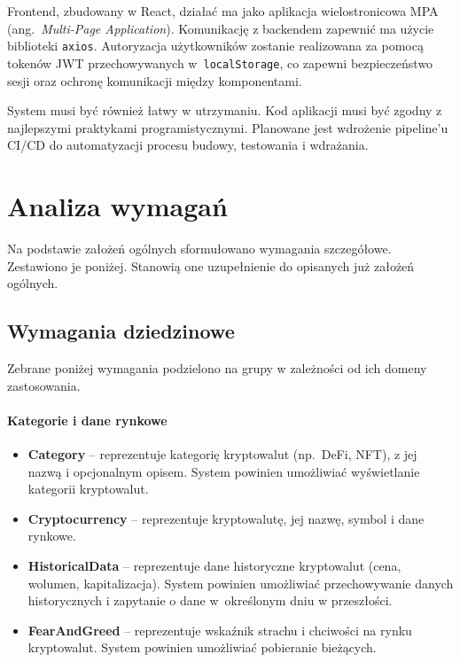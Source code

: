 Frontend, zbudowany w React, działać ma jako aplikacja wielostronicowa MPA (ang.~\emph{Multi-Page Application}). Komunikację z backendem zapewnić ma użycie biblioteki \texttt{axios}. Autoryzacja użytkowników zostanie realizowana za pomocą tokenów JWT przechowywanych w~\texttt{localStorage}, co zapewni bezpieczeństwo sesji oraz ochronę komunikacji między komponentami.

System musi być również łatwy w utrzymaniu. Kod aplikacji musi być zgodny z najlepszymi praktykami programistycznymi. Planowane jest wdrożenie pipeline’u CI/CD do automatyzacji procesu budowy, testowania i wdrażania.


\section{Analiza wymagań}
Na podstawie założeń ogólnych sformułowano wymagania szczegółowe. Zestawiono je poniżej. Stanowią one uzupełnienie do opisanych już założeń ogólnych. 
\subsection{Wymagania dziedzinowe}
Zebrane poniżej wymagania podzielono na grupy w zależności od ich domeny zastosowania. %

\paragraph{Kategorie i dane rynkowe}
\begin{itemize}
\item \textbf{Category} -- reprezentuje kategorię kryptowalut (np.\ DeFi, NFT), z jej nazwą i opcjonalnym opisem. System powinien umożliwiać wyświetlanie kategorii kryptowalut.
\item \textbf{Cryptocurrency} -- reprezentuje kryptowalutę, jej nazwę, symbol i dane rynkowe.
\item \textbf{HistoricalData} -- reprezentuje dane historyczne kryptowalut (cena, wolumen, kapitalizacja). System powinien umożliwiać przechowywanie danych historycznych i zapytanie o dane w~określonym dniu w przeszłości.
\item \textbf{FearAndGreed} -- reprezentuje wskaźnik strachu i chciwości na rynku kryptowalut. System powinien umożliwiać pobieranie bieżących.
\end{itemize}

